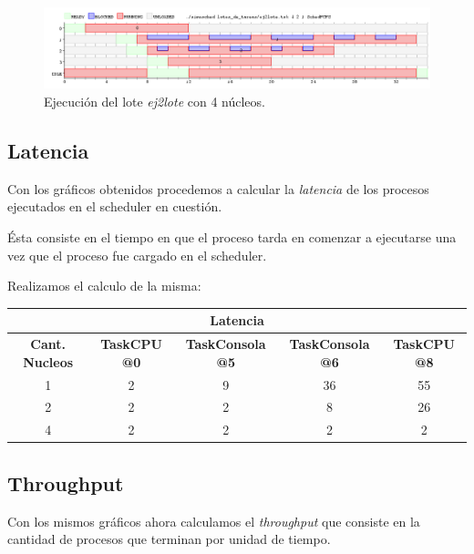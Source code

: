 \begin{figure}[!h]
	\begin{center}
		\includegraphics[width=500px]{imagenes/ej2_4.png}
		\caption{Ejecución del lote \emph{ej2lote} con 4 núcleos.}
		\label{fig:grafico_ej2_4}
	\end{center}
\end{figure}

\newpage

\subsection{Latencia} \label{ej2_latencia}

Con los gráficos obtenidos procedemos a calcular la \emph{latencia} de los procesos ejecutados en el scheduler en cuestión.

Ésta consiste en el tiempo en que el proceso tarda en comenzar a ejecutarse una vez que el proceso fue cargado en el scheduler.

Realizamos el calculo de la misma:

\begin{center}
	\begin{tabular}{|c|c|c|c|c|}
		\hline
		\multicolumn{5}{|c|}{\large{\textbf{Latencia}}} \\
		\hline
		\textbf{Cant. Nucleos} & \textbf{TaskCPU @0} & \textbf{TaskConsola @5} & \textbf{TaskConsola @6} & \textbf{TaskCPU @8} \\
		\hline
		1 & 2 & 9 & 36 & 55 \\
		2 & 2 & 2 & 8 & 26 \\
		4 & 2 & 2 & 2 & 2 \\
		\hline
	\end{tabular}
\end{center}


\subsection{Throughput}

Con los mismos gráficos ahora calculamos el \emph{throughput} que consiste en la cantidad de procesos que terminan por unidad de tiempo.

